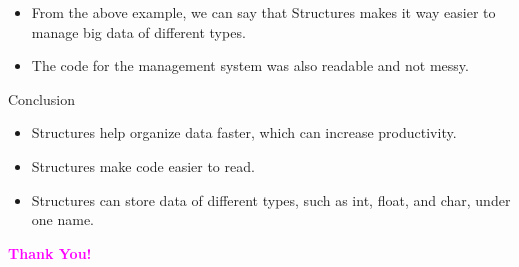 \documentclass[13pt]{beamer}
\begin{document}
\begin{frame}
    \begin{itemize}
        \item From the above example, we can say that Structures makes it way easier to manage big data of different types.
        \item The code for the management system was also readable and not messy. 
    \end{itemize}
\end{frame}

\begin{frame}{Conclusion}
    \begin{itemize}
        \item Structures help organize data faster, which can increase productivity.
        \item Structures make code easier to read.
        \item Structures can store data of different types, such as int, float, and char, under one name.
    \end{itemize}
\end{frame}

\begin{frame}
    \begin{center}
    \begin{large}
    \textcolor{magenta}{\textbf{Thank You!}}
    \end{large}
    \end{center}
\end{frame}
\end{document}
